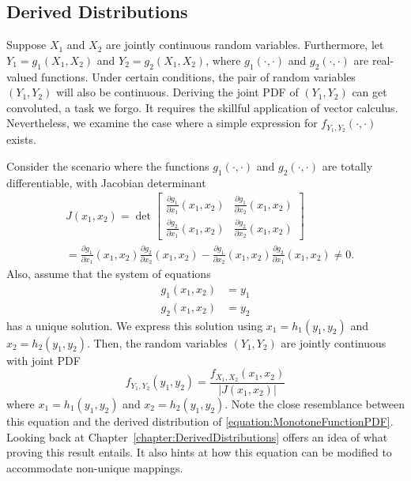 \subsection{Derived Distributions}

Suppose $X_1$ and $X_2$ are jointly continuous random variables.
Furthermore, let $Y_1 = g_1 (X_1, X_2)$ and $Y_2 = g_2 (X_1, X_2)$, where $g_1 (\cdot, \cdot)$ and $g_2 (\cdot, \cdot)$ are real-valued functions.
Under certain conditions, the pair of random variables $(Y_1, Y_2)$ will also be continuous.
Deriving the joint PDF of $(Y_1, Y_2)$ can get convoluted, a task we forgo.
It requires the skillful application of vector calculus.
Nevertheless, we examine the case where a simple expression for $f_{Y_1, Y_2} (\cdot, \cdot)$ exists.

Consider the scenario where the functions $g_1 (\cdot, \cdot)$ and $g_2 (\cdot, \cdot)$ are totally differentiable, with Jacobian determinant
\begin{equation*}
\begin{split}
&J(x_1, x_2) = \operatorname{det} \begin{bmatrix}
\frac{\partial g_1}{\partial x_1} (x_1, x_2) &
\frac{\partial g_1}{\partial x_2} (x_1, x_2) \\
\frac{\partial g_2}{\partial x_1} (x_1, x_2) &
\frac{\partial g_2}{\partial x_2} (x_1, x_2)
\end{bmatrix} \\
&= \frac{\partial g_1}{\partial x_1} (x_1, x_2)
\frac{\partial g_2}{\partial x_2} (x_1, x_2)
- \frac{\partial g_1}{\partial x_2} (x_1, x_2)
\frac{\partial g_2}{\partial x_1} (x_1, x_2)
\neq 0 .
\end{split}
\end{equation*}
Also, assume that the system of equations
\begin{align*}
g_1 (x_1, x_2) &= y_1 \\
g_2 (x_1, x_2) &= y_2
\end{align*}
has a unique solution.
We express this solution using $x_1 = h_1 (y_1, y_2)$ and $x_2 = h_2 (y_1, y_2)$.
Then, the random variables $(Y_1, Y_2)$ are jointly continuous with joint PDF
\begin{equation} \label{equation:DerivedJointPDF}
f_{Y_1, Y_2} (y_1, y_2) =
\frac{f_{X_1, X_2} (x_1, x_2)}{ | J(x_1, x_2) |}
\end{equation}
where $x_1 = h_1 (y_1, y_2)$ and $x_2 = h_2 (y_1, y_2)$.
Note the close resemblance between this equation and the derived distribution of \eqref{equation:MonotoneFunctionPDF}.
Looking back at Chapter~\ref{chapter:DerivedDistributions} offers an idea of what proving this result entails.
It also hints at how this equation can be modified to accommodate non-unique mappings.


